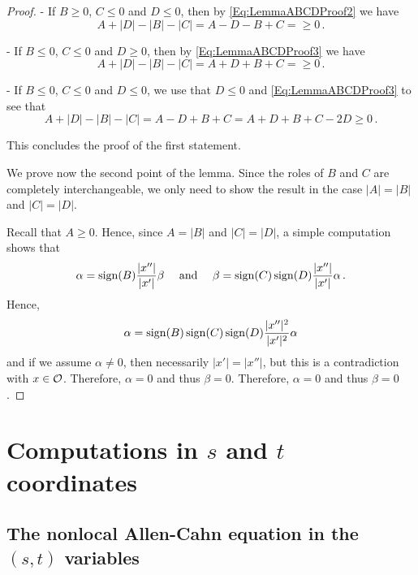 \begin{proof}
- If $B \geq 0$, $C \leq 0$ and $D \leq 0$, then by \eqref{Eq:LemmaABCDProof2} we have
$$
A + |D| - |B| - |C| = A - D - B + C = \geq 0\,.
$$

- If $B \leq 0$, $C \leq 0$ and $D \geq 0$, then by \eqref{Eq:LemmaABCDProof3} we have
$$
A + |D| - |B| - |C| = A + D + B + C = \geq 0\,.
$$

- If $B \leq 0$, $C \leq 0$ and $D \leq 0$, we use that $D\leq 0$ and \eqref{Eq:LemmaABCDProof3} to see that
$$
A + |D| - |B| - |C| = A - D + B + C =  A + D + B + C -2D \geq 0\,.
$$

This concludes the proof of the first statement.

We prove now the second point of the lemma. Since the roles of $B$ and $C$ are completely interchangeable, we only need to show the result in the case
$|A| = |B|$ and $|C| = |D|$. 

Recall that $A \geq 0$. Hence, since $A = |B|$ and $|C| = |D|$, a simple computation shows that
$$
\alpha = \operatorname{sign} (B) \dfrac{|x''|}{|x'|}\beta \quad \textrm{ and } \quad 
\beta = \operatorname{sign} (C) \operatorname{sign}(D) \dfrac{|x''|}{|x'|} \alpha \,.
$$
Hence, 
$$
\alpha = \operatorname{sign} (B) \operatorname{sign} (C) \operatorname{sign}(D) \dfrac{|x''|^2}{|x'|^2} \alpha
$$
and if we assume $\alpha \neq 0$, then necessarily $|x'| = |x''|$, but this is a contradiction with $x\in \mathcal{O}$. Therefore, $\alpha = 0$ and thus $\beta = 0$. Therefore, $\alpha = 0$ and thus $\beta = 0$.
\end{proof}








\section{Computations in $s$ and $t$ coordinates}
\label{Sec:stcomputations}


\subsection{The nonlocal Allen-Cahn equation in the $(s,t)$ variables}

